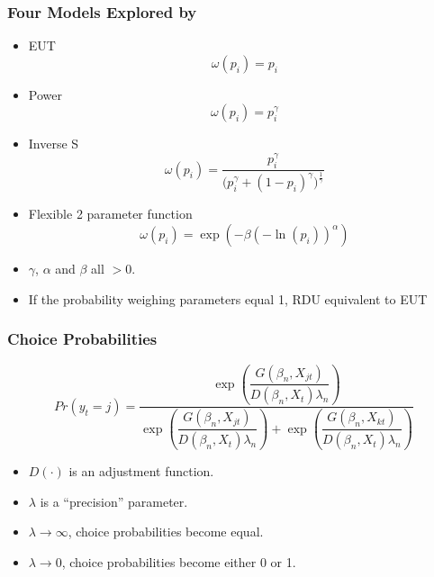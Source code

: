 \documentclass{beamer}
\newcommand\Prob{\ensuremath{\mathit{Pr}}}  %
\begin{document}
\begin{frame}
\frametitle{Four Models Explored by \textcite{Harrison2016}}
\begin{itemize}
	\item EUT
		\begin{equation}
			\label{eq4:pw:eut}
			\omega(p_i) = p_i
		\end{equation}
	\item Power \parencite{Quiggin1982}
		\begin{equation}
			\label{eq4:pw:pow}
			\omega(p_i)=p_i^\gamma
		\end{equation}
	\item Inverse S \parencite{Kahneman1979}
		\begin{equation}
			\label{eq4:pw:inv}
			\omega(p_i) = \frac{p_i^\gamma}{\biggl(p_i^\gamma + {(1-p_i)}^\gamma\biggr)^{ \frac{1}{\gamma} } }
		\end{equation}
	\item Flexible 2 parameter function \parencite{Prelec1998}
		\begin{equation}
			\label{eq4:pw:pre}
			\omega(p_i)=\exp(-\beta(-\ln(p_i))^\alpha)
		\end{equation}

	\item $\gamma$, $\alpha$ and $\beta$ all $> 0$.
	\item If the probability weighing parameters equal 1, RDU equivalent to EUT

\end{itemize}
\end{frame}

\begin{frame}
\frametitle{Choice Probabilities}
\begin{equation}
	\label{eq4:RE.f}
	{\Prob}(y_t=j) =\dfrac{\exp\!\left( \dfrac{ G(\beta_n,X_{jt}) }{ D(\beta_n,X_{t})\lambda_n }  \right)}{  \exp\!\left( \dfrac{ G(\beta_n,X_{jt}) }{ D(\beta_n,X_{t})\lambda_n }  \right) + \exp\!\left( \dfrac{ G(\beta_n,X_{kt}) }{ D(\beta_n,X_{t})\lambda_n }  \right)    }
\end{equation}
\begin{itemize}
	\item $D(\cdot)$ is an adjustment function.
	\item $\lambda$ is a \enquote{precision} parameter.
	\item $\lambda \rightarrow \infty$, choice probabilities become equal.
	\item $\lambda \rightarrow 0$, choice probabilities become either 0 or 1.
	
\end{itemize}

\end{frame}
\end{document}
